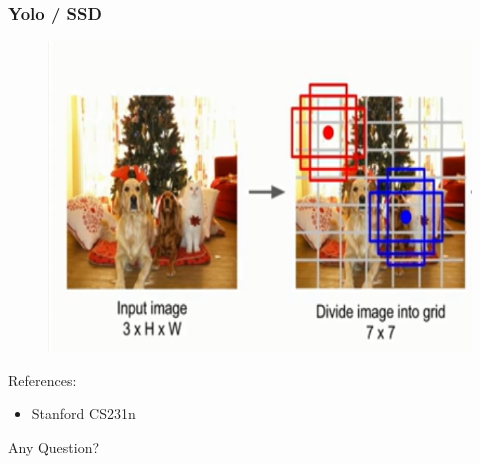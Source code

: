 \documentclass{beamer}
\begin{document}
\begin{frame}
	\frametitle{Yolo / SSD}
	\begin{figure}
		\includegraphics[width= .8\linewidth]{Pics/yolo.PNG}
	\end{figure}
\end{frame}

\begin{frame}
	References:
	\begin{itemize}
		\item Stanford CS231n
	\end{itemize}
\end{frame}

\begin{frame}
\Huge
\centering
Any Question?
\end{frame}
\end{document}
